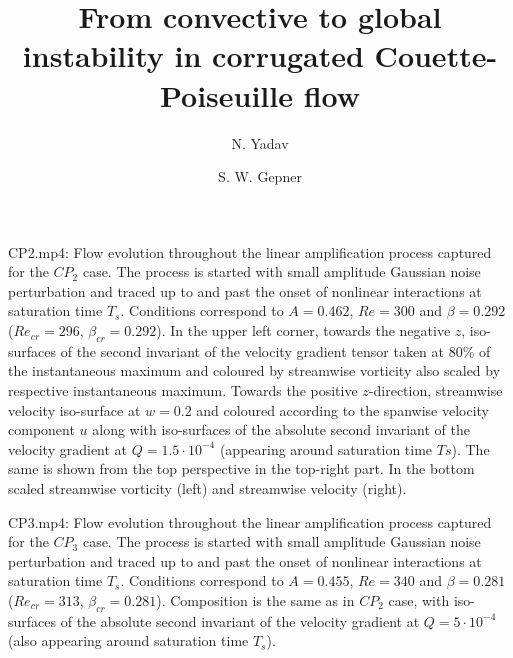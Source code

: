 \documentclass[lineno]{jfm}
\title{From convective to global instability in corrugated Couette-Poiseuille flow}
\author
{
 N. Yadav\aff{1} \and
 S. W. Gepner\aff{1} \corresp{\email{stanislaw.gepner@pw.edu.pl}}
}
\affiliation{\aff{1}Warsaw University of Technology, Institute of Aeronautics and Applied Mechanics, Nowowiejska 24, 00-665 Warsaw, Poland}
\begin{document}
\maketitle

CP2.mp4:
Flow evolution throughout the linear amplification process captured for the $CP_2$ case. The process is started with small amplitude Gaussian noise perturbation and traced up to and past the onset of nonlinear interactions at saturation time $T_s$. Conditions correspond to $A=0.462$, $Re=300$ and $\beta=0.292$ ($Re_{cr}=296$, $\beta_{cr}=0.292$).
In the upper left corner, towards the negative $z$, iso-surfaces of the second invariant of the velocity gradient tensor taken at $80\%$ of the instantaneous maximum and coloured by streamwise vorticity also scaled by respective instantaneous maximum.
Towards the positive $z$-direction, streamwise velocity iso-surface at $w=0.2$ and coloured according to the spanwise velocity component $u$ along with iso-surfaces of the absolute second invariant of the velocity gradient at $Q=1.5\cdot10^{-4}$ (appearing around saturation time $Ts$).
The same is shown from the top perspective in the top-right part.
In the bottom scaled streamwise vorticity (left) and streamwise velocity (right).

\vspace{20pt}

CP3.mp4:
Flow evolution throughout the linear amplification process captured for the $CP_3$ case. The process is started with small amplitude Gaussian noise perturbation and traced up to and past the onset of nonlinear interactions at saturation time $T_s$. Conditions correspond to $A=0.455$, $Re =340$ and $\beta=0.281$ ($Re_{cr}=313$, $\beta_{cr}=0.281$). Composition is the same as in $CP_2$ case, with iso-surfaces of the absolute second invariant of the velocity gradient at $Q=5\cdot10^{-4}$ (also appearing around saturation time $T_s$).
\end{document}

